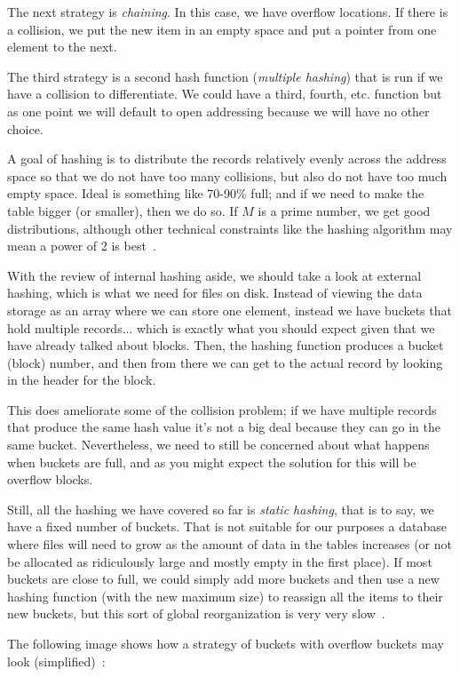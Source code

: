 The next strategy is \textit{chaining}. In this case, we have overflow locations. If there is a collision, we put the new item in an empty space and put a pointer from one element to the next. 

The third strategy is a second hash function (\textit{multiple hashing}) that is run if we have a collision to differentiate. We could have a third, fourth, etc. function but as one point we will default to open addressing because we will have no other choice.

A goal of hashing is to distribute the records relatively evenly across the address space so that we do not have too many collisions, but also do not have too much empty space. Ideal is something like 70-90\% full; and if we need to make the table bigger (or smaller), then we do so. If $M$ is a prime number, we get good distributions, although other technical constraints like the hashing algorithm may mean a power of 2 is best~\cite{fds}.

With the review of internal hashing aside, we should take a look at external hashing, which is what we need for files on disk. Instead of viewing the data storage as an array  where we can store one element, instead we have buckets that hold multiple records... which is exactly what you should expect given that we have already talked about blocks. Then, the hashing function produces a bucket (block) number, and then from there we can get to the actual record by looking in the header for the block. 

This does ameliorate some of the collision problem; if we have multiple records that produce the same hash value it's not a big deal because they can go in the same bucket. Nevertheless, we need to still be concerned about what happens when buckets are full, and as you might expect the solution for this will be overflow blocks. 

Still, all the hashing we have covered so far is \textit{static hashing}, that is to say, we have a fixed number of buckets. That is not suitable for our purposes a database where files will need to grow as the amount of data in the tables increases (or not be allocated as ridiculously large and mostly empty in the first place). If most buckets are close to full, we could simply add more buckets and then use a new hashing function (with the new maximum size) to reassign all the items to their new buckets, but this sort of global reorganization is very very slow~\cite{fds}.

The following image shows how a strategy of buckets with overflow buckets may look (simplified)~\cite{fds}:

